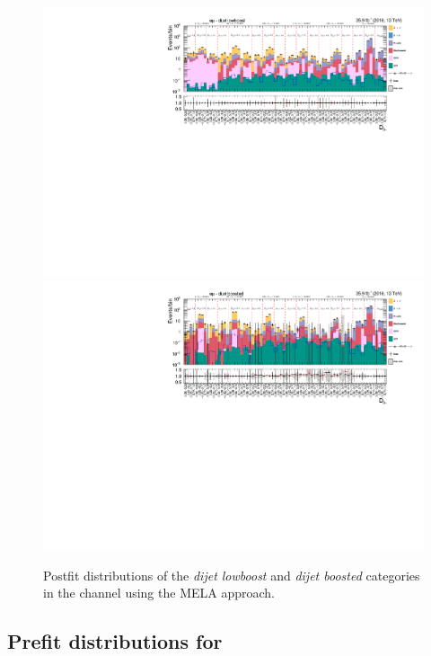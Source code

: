 \begin{figure}[h!]
    \centering
        \includegraphics[width=\textwidth]{Figures/statana/Postfit_JEC_mela3D/postfit_fit_s_htt_em_3_13TeV.pdf}\\
        \includegraphics[width=\textwidth]{Figures/statana/Postfit_JEC_mela3D/postfit_fit_s_htt_em_4_13TeV.pdf}
    \caption{Postfit distributions of the \textit{dijet lowboost} and \textit{dijet boosted} categories in the \emu{} channel  using the MELA approach.}\label{SUPPLE:SA:postfit_em_2jet}
\end{figure}
\clearpage

\subsection{Prefit distributions for \jdphi}


